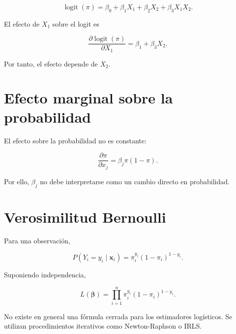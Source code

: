 \documentclass[
  spanish,
  10.5pt,
  letterpaper,
  DIV=11,
  numbers=noendperiod,
  oneside,
  open=any]{scrreprt}
\theoremstyle{definition}
\theoremstyle{definition}
\theoremstyle{plain}
\theoremstyle{remark}
\begin{document}
\[
\operatorname{logit}(\pi)
=
\beta_0+\beta_1X_1+\beta_2X_2+\beta_3X_1X_2.
\]

El efecto de \(X_1\) sobre el logit es

\[
\frac{\partial\operatorname{logit}(\pi)}
{\partial X_1}
=
\beta_1+\beta_3X_2.
\]

Por tanto, el efecto depende de \(X_2\).

\section*{Efecto marginal sobre la
probabilidad}\label{efecto-marginal-sobre-la-probabilidad}


El efecto sobre la probabilidad no es constante:

\[
\frac{\partial\pi}{\partial x_j}
=
\beta_j\pi(1-\pi).
\]

Por ello, \(\beta_j\) no debe interpretarse como un cambio directo en
probabilidad.

\section*{Verosimilitud Bernoulli}\label{verosimilitud-bernoulli}


Para una observación,

\[
P(Y_i=y_i\mid\mathbf{x}_i)
=
\pi_i^{y_i}(1-\pi_i)^{1-y_i}.
\]

Suponiendo independencia,

\[
L(\boldsymbol{\beta})
=
\prod_{i=1}^{n}
\pi_i^{y_i}(1-\pi_i)^{1-y_i}.
\]

\begin{tcolorbox}[enhanced jigsaw, arc=.35mm, bottomrule=.15mm, bottomtitle=1mm, breakable, colback=white, colbacktitle=quarto-callout-important-color!10!white, colframe=quarto-callout-important-color-frame, coltitle=black, left=2mm, leftrule=.75mm, opacityback=0, opacitybacktitle=0.6, rightrule=.15mm, title=\textcolor{quarto-callout-important-color}{\faExclamation}\hspace{0.5em}{Estimación por máxima verosimilitud}, titlerule=0mm, toprule=.15mm, toptitle=1mm]

No existe en general una fórmula cerrada para los estimadores
logísticos. Se utilizan procedimientos iterativos como Newton-Raphson o
IRLS.

\end{tcolorbox}
\end{document}
